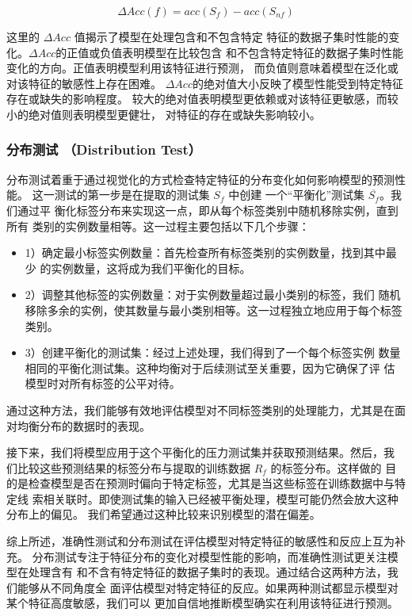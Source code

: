 \begin{equation}
\Delta Acc(f) = acc(S_f) - acc(S_{nf})
\end{equation}

这里的 \(\Delta Acc\) 值揭示了模型在处理包含和不包含特定
特征的数据子集时性能的变化。$\Delta Acc$的正值或负值表明模型在比较包含
和不包含特定特征的数据子集时性能变化的方向。正值表明模型利用该特征进行预测，
而负值则意味着模型在泛化或对该特征的敏感性上存在困难。
$\Delta Acc$的绝对值大小反映了模型性能受到特定特征存在或缺失的影响程度。
较大的绝对值表明模型更依赖或对该特征更敏感，而较小的绝对值则表明模型更健壮，
对特征的存在或缺失影响较小。


\subsubsection*{分布测试 （Distribution Test）}
\label{sec4:distributiontest}
分布测试着重于通过视觉化的方式检查特定特征的分布变化如何影响模型的预测性能。
这一测试的第一步是在提取的测试集 \(S_f\) 中创建
一个``平衡化''测试集 \(\overline{S_f}\)。我们通过平
衡化标签分布来实现这一点，即从每个标签类别中随机移除实例，直到所有
类别的实例数量相等。这一过程主要包括以下几个步骤：

\begin{itemize}
  \item 1）确定最小标签实例数量：首先检查所有标签类别的实例数量，找到其中最少
  的实例数量，这将成为我们平衡化的目标。
  \item 2）调整其他标签的实例数量：对于实例数量超过最小类别的标签，我们
  随机移除多余的实例，使其数量与最小类别相等。这一过程独立地应用于每个标签类别。
  \item 3）创建平衡化的测试集：经过上述处理，我们得到了一个每个标签实例
  数量相同的平衡化测试集。这种均衡对于后续测试至关重要，因为它确保了评
  估模型时对所有标签的公平对待。
\end{itemize}

通过这种方法，我们能够有效地评估模型对不同标签类别的处理能力，尤其是在面
对均衡分布的数据时的表现。

接下来，我们将模型应用于这个平衡化的压力测试集并获取预测结果。然后，我
们比较这些预测结果的标签分布与提取的训练数据 \(R_f\) 的标签分布。这样做的
目的是检查模型是否在预测时偏向于特定标签，尤其是当这些标签在训练数据中与特定线
索相关联时。即使测试集的输入已经被平衡处理，模型可能仍然会放大这种分布上的偏见。
我们希望通过这种比较来识别模型的潜在偏差。

综上所述，准确性测试和分布测试在评估模型对特定特征的敏感性和反应上互为补充。
分布测试专注于特征分布的变化对模型性能的影响，而准确性测试更关注模型在处理含有
和不含有特定特征的数据子集时的表现。通过结合这两种方法，我们能够从不同角度全
面评估模型对特定特征的反应。如果两种测试都显示模型对某个特征高度敏感，我们可以
更加自信地推断模型确实在利用该特征进行预测。


